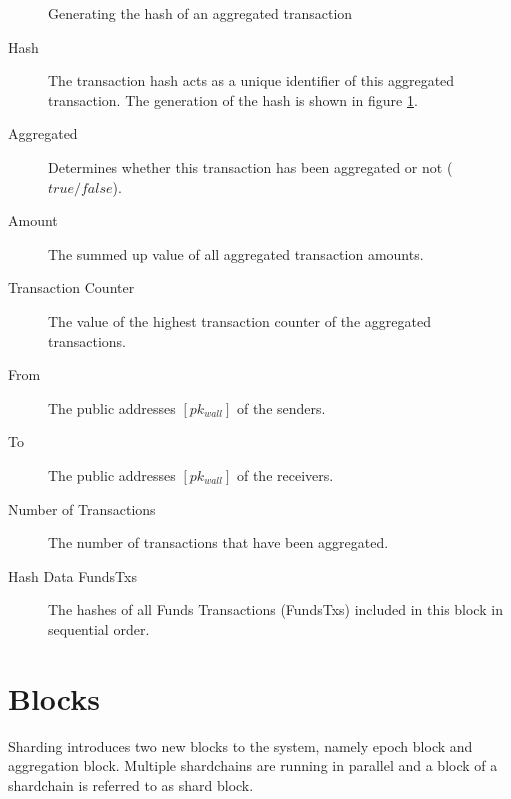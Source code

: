 \begin{figure}[hbt]
\centering
{}  
\caption{Generating the hash of an aggregated transaction\label{fig:AggTxHash}}
\end{figure}  

\begin{description}
  \item[Hash] The transaction hash acts as a unique identifier of this aggregated transaction. The generation of the hash is shown in figure \ref{fig:AggTxHash}.
  \item[Aggregated] Determines whether this transaction has been aggregated or not ($true/false$).
  \item[Amount] The summed up value of all aggregated transaction amounts.
  \item[Transaction Counter] The value of the highest transaction counter of the aggregated transactions.
  \item[From] The public addresses $[pk_{wall}]$ of the senders.
  \item[To] The public addresses $[pk_{wall}]$ of the receivers.
  \item[Number of Transactions] The number of transactions that have been aggregated.
  \item[Hash Data FundsTxs] The hashes of all Funds Transactions (FundsTxs) included in this block in sequential order.
\end{description}

\section{Blocks}

Sharding introduces two new blocks to the system, namely epoch block and aggregation block. Multiple shardchains are running in parallel and a block of a shardchain is referred to as shard block.

